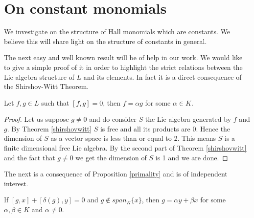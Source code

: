 \documentclass{cimart}
\begin{document}


\section{On constant monomials}



We investigate on the structure of Hall monomials which are constants. We believe this will share light on the structure of constants in general.

The next easy and well known result will be of help in our work. We would like to give a simple proof of it in order to highlight the strict relations between the Lie algebra structure of $L$ and its elements. In fact it is a direct consequence of the Shirshov-Witt Theorem.

\begin{proposition}\label{primality}
Let $f,g\in L$ such that $[f,g]=0$, then $f=\alpha g$ for some $\alpha \in K$.
\end{proposition}
\begin{proof}
Let us suppose $g\neq0$ and do consider $S$ the Lie algebra generated by $f$ and $g$. By Theorem \ref{shirshovwitt} $S$ is free and all its products are 0. Hence the dimension of $S$ as a vector space is less than or equal to 2. This means $S$ is a finite dimensional free Lie algebra. By the second part of Theorem \ref{shirshovwitt} and the fact that $g\neq0$ we get the dimension of $S$ is 1 and we are done.
\end{proof}

The next is a consequence of Proposition \ref{primality} and is of independent interest.

\begin{corollary} If $[g, x] + [\delta(g), y] = 0$ and $g\notin span_K\{x\}$, then $g = \alpha y+\beta x$ for some $\alpha,\beta \in K$ and $\alpha\neq 0$.
\end{corollary}
\end{document}
